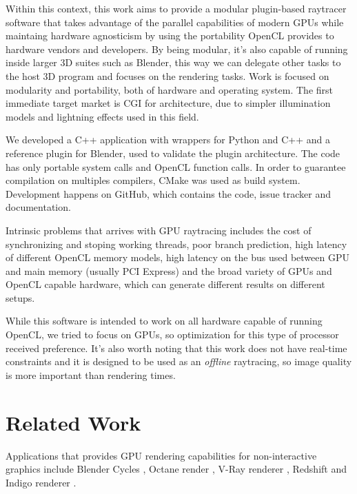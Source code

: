 \documentclass[a4paper]{sbgames}               %
\begin{document}
Within this context, this work aims to provide a modular plugin-based
raytracer software that takes advantage of the parallel capabilities
of modern GPUs while maintaing hardware agnosticism by using the
portability OpenCL provides to hardware vendors and developers. By
being modular, it's also capable of running inside larger 3D suites
such as Blender, this way we can delegate other tasks to the host 3D
program and focuses on the rendering tasks. Work is focused on
modularity and portability, both of hardware and operating system. The
first immediate target market is CGI for architecture, due to simpler
illumination models and lightning effects used in this field.

We developed a C++ application with wrappers for
Python %
and C++ and a reference plugin for Blender, used to validate the
plugin architecture. The code has only portable system calls and
OpenCL function calls. In order to guarantee compilation on multiples
compilers, CMake was used as build system. Development happens on
GitHub, which contains the code, issue tracker and
documentation.

Intrinsic problems that arrives with GPU raytracing includes the cost
of synchronizing and stoping working threads, poor branch prediction,
high latency of different OpenCL memory models, high latency on the
bus used between GPU and main memory (usually PCI Express) and the
broad variety of GPUs and OpenCL capable hardware, which can generate
different results on different setups.

While this software is intended to work on all hardware capable of
running OpenCL, we tried to focus on GPUs, so optimization for this
type of processor received preference. It's also worth noting that
this work does not have real-time constraints and it is designed to be
used as an \emph{offline} raytracing, so image quality is more
important than rendering times.

\section{Related Work}
\label{sec:related-work}

Applications that provides GPU rendering capabilities for
non-interactive graphics include Blender Cycles\cite{Cycles} , Octane
render \cite{Octane}, V-Ray renderer \cite{VRAY}, Redshift
\cite{Redshift} and Indigo renderer \cite{Indigo}.
\end{document}
